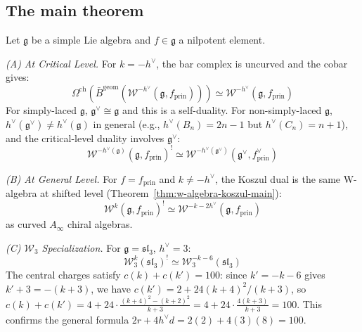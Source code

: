 \subsection{The main theorem}

\begin{theorem}\label{thm:w-koszul-precise}
Let $\mathfrak{g}$ be a simple Lie algebra and $f \in \mathfrak{g}$ a nilpotent element.

\emph{(A) At Critical Level.} For $k = -h^\vee$, the bar complex is uncurved and the cobar gives:
\begin{equation}
\Omega^{\mathrm{ch}}(\bar{B}^{\mathrm{geom}}(\mathcal{W}^{-h^\vee}(\mathfrak{g}, f_{\mathrm{prin}}))) \simeq \mathcal{W}^{-h^{\vee}}(\mathfrak{g}, f_{\mathrm{prin}})
\end{equation}
For simply-laced $\mathfrak{g}$, $\mathfrak{g}^\vee \cong \mathfrak{g}$ and this is a self-duality.  For non-simply-laced $\mathfrak{g}$, $h^{\vee}(\mathfrak{g}^{\vee}) \neq h^{\vee}(\mathfrak{g})$ in general (e.g., $h^{\vee}(B_n) = 2n-1$ but $h^{\vee}(C_n) = n+1$), and the critical-level duality involves $\mathfrak{g}^\vee$:
\begin{equation}
\mathcal{W}^{-h^\vee(\mathfrak{g})}(\mathfrak{g}, f_{\mathrm{prin}})^! \simeq \mathcal{W}^{-h^\vee(\mathfrak{g}^\vee)}(\mathfrak{g}^\vee, f_{\mathrm{prin}}^\vee)
\end{equation}

\emph{(B) At General Level.} For $f = f_{\mathrm{prin}}$ and $k \neq -h^\vee$, the Koszul dual is the same W-algebra at shifted level (Theorem~\ref{thm:w-algebra-koszul-main}):
\begin{equation}
\mathcal{W}^k(\mathfrak{g}, f_{\mathrm{prin}})^! \simeq \mathcal{W}^{-k-2h^\vee}(\mathfrak{g}, f_{\mathrm{prin}})
\end{equation}
as curved $A_\infty$ chiral algebras.

\emph{(C) $\mathcal{W}_3$ Specialization.} For $\mathfrak{g} = \mathfrak{sl}_3$, $h^\vee = 3$:
\begin{equation}
\mathcal{W}_3^k(\mathfrak{sl}_3)^! \simeq \mathcal{W}_3^{-k-6}(\mathfrak{sl}_3)
\end{equation}
The central charges satisfy $c(k) + c(k') = 100$: since $k' = -k-6$ gives $k'+3 = -(k+3)$, we have $c(k') = 2 + 24(k+4)^2/(k+3)$, so $c(k) + c(k') = 4 + 24 \cdot \frac{(k+4)^2 - (k+2)^2}{k+3} = 4 + 24 \cdot \frac{4(k+3)}{k+3} = 100$.
This confirms the general formula $2r + 4h^\vee d = 2(2) + 4(3)(8) = 100$.
\end{theorem}

